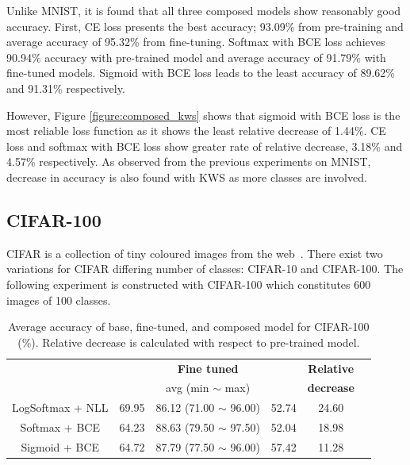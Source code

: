 \documentclass{article}
\begin{document}
Unlike MNIST, it is found that all three composed models show reasonably good accuracy. First, CE loss presents the best accuracy; 93.09\% from pre-training and average accuracy of 95.32\% from fine-tuning. Softmax with BCE loss achieves 90.94\% accuracy with pre-trained model and average accuracy of 91.79\% with fine-tuned models. Sigmoid with BCE loss leads to the least accuracy of 89.62\% and 91.31\% respectively.

However, Figure \ref{figure:composed_kws} shows that sigmoid with BCE loss is the most reliable loss function as it shows the least relative decrease of 1.44\%. CE loss and softmax with BCE loss show greater rate of relative decrease, 3.18\% and 4.57\% respectively. As observed from the previous experiments on MNIST, decrease in accuracy is also found with KWS as more classes are involved.

\subsection{CIFAR-100}
CIFAR is a collection of tiny coloured images from the web~\cite{krizhevsky2009learning}. There exist two variations for CIFAR differing number of classes: CIFAR-10 and CIFAR-100. The following experiment is constructed with CIFAR-100 which constitutes 600 images of 100 classes.

\begin{table}[t]
    \centering
    \begin{tabular}{cccccc}
        \toprule[1pt]
        \multirow{2}{*}{\raisebox{-3\heavyrulewidth}{\bf Loss function}} &
        \multirow{2}{*}{\raisebox{-3\heavyrulewidth}{\bf Pre-trained }} &
        \textbf{Fine tuned} &
        \multirow{2}{*}{\raisebox{-3\heavyrulewidth}{ \bf Composed }} &
        \textbf{ Relative } \\
        & & avg (min $\sim$ max) & & \textbf{ decrease } \\
        \midrule
        LogSoftmax + NLL & 69.95 & 86.12 (71.00 $\sim$ 96.00) & 52.74 & 24.60 \\
        Softmax + BCE & 64.23 & 88.63 (79.50 $\sim$ 97.50) & 52.04 & 18.98 \\
        Sigmoid + BCE & 64.72 & 87.79 (77.50 $\sim$ 96.00) & 57.42 & 11.28 \\
        \bottomrule[1pt]
    \end{tabular}
    \caption{Average accuracy of base, fine-tuned, and composed model for CIFAR-100 (\%). Relative decrease is calculated with respect to pre-trained model.}
    \label{table:cifar}
\end{table}
\end{document}
